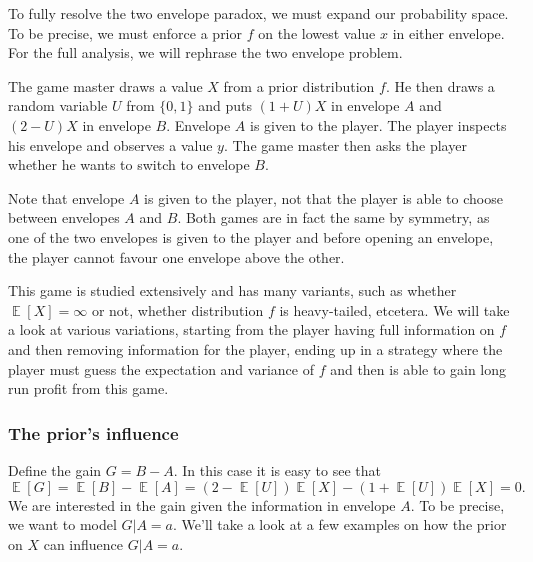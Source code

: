\documentclass[twoside,a4paper]{article}
\theoremstyle{plain}
\theoremstyle{definition}
\theoremstyle{remark}
\numberwithin{equation}{section}
\DeclareMathOperator{\E}{\mathbb{E}}
\DeclareMathOperator{\1}{\mathbbm{1}}
\begin{document}
To fully resolve the two envelope paradox, we must expand our probability space. To be precise, we must enforce a prior $f$ on the lowest value $x$ in either envelope. For the full analysis, we will rephrase the two envelope problem.

The game master draws a value $X$ from a prior distribution $f$. He then draws a random variable $U$ from $\{0,1\}$ and puts $(1+U)X$ in envelope $A$ and $(2-U)X$ in envelope $B$. Envelope $A$ is given to the player. The player inspects his envelope and observes a value $y$. The game master then asks the player whether he wants to switch to envelope $B$.

Note that envelope $A$ is given to the player, not that the player is able to choose between envelopes $A$ and $B$. Both games are in fact the same by symmetry, as one of the two envelopes is given to the player and before opening an envelope, the player cannot favour one envelope above the other.

This game is studied extensively and has many variants, such as whether $\E[X]=\infty$ or not, whether distribution $f$ is heavy-tailed, etcetera. We will take a look at various variations, starting from the player having full information on $f$ and then removing information for the player, ending up in a strategy where the player must guess the expectation and variance of $f$ and then is able to gain long run profit from this game.

\subsubsection{The prior's influence}
Define the gain $G=B-A$. In this case it is easy to see that
\[\E[G]=\E[B]-\E[A]=(2-\E[U])\E[X]-(1+\E[U])\E[X]=0.\]
We are interested in the gain given the information in envelope $A$. To be precise, we want to model $G|A=a$. We'll take a look at a few examples on how the prior on $X$ can influence $G|A=a$.
\end{document}
